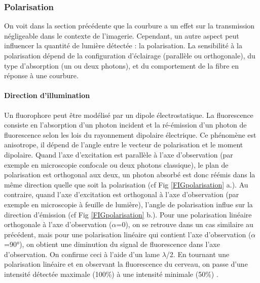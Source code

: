\subsubsection{Polarisation}


On voit dans la section précédente que la courbure a un effet sur la transmission négligeable dans le contexte de l'imagerie. Cependant, un autre aspect peut influencer la quantité de lumière détectée : la polarisation. La sensibilité à la polarisation dépend de la configuration d'éclairage (parallèle ou orthogonale), du type d'absorption (un ou deux photons), et du comportement de la fibre en réponse à une courbure.

\paragraph{Direction d'illumination}

Un fluorophore peut être modélisé par un dipole électrostatique. La fluorescence consiste en l'absorption d'un photon incident et la ré-émission d'un photon de fluorescence selon les lois du rayonnement dipolaire électrique. Ce phénomène est anisotrope, il dépend de l'angle entre le vecteur de polarisation et le moment dipolaire. Quand l'axe d'excitation est parallèle à l'axe d'observation (par exemple en microscopie confocale ou deux photons classique), le plan de polarisation est orthogonal aux deux, un photon absorbé est donc réémis dans la même direction quelle que soit la polarisation (cf Fig \ref{FIGpolarisation} a.). Au contraire, quand l'axe d'excitation est orthogonal à l'axe d'observation (par exemple en microscopie à feuille de lumière), l'angle de polarisation influe sur la direction d'émission (cf Fig \ref{FIGpolarisation} b.). Pour une polarisation linéaire orthogonale à l'axe d'observation ($\alpha$=0), on se retrouve dans un cas similaire au précédent, mais pour une polarisation linéaire qui contient l'axe d'observation ($\alpha$=90°), on obtient une diminution du signal de fluorescence dans l'axe d'observation.
On confirme ceci à l'aide d'un lame $\lambda$/2. En tournant une polarisation linéaire et en observant la fluorescence du cerveau, on passe d'une intensité détectée maximale (100\%) à une intensité minimale (50\%) \cite{de_vito_effects_2020}.

